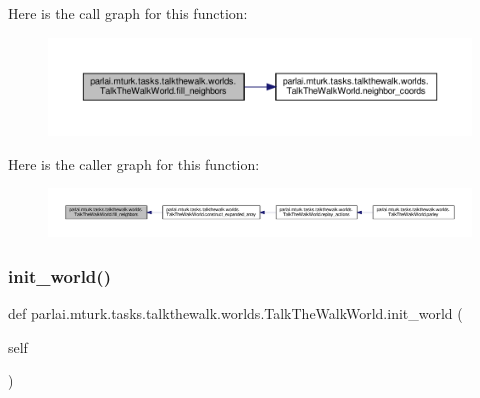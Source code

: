 Here is the call graph for this function\+:
\nopagebreak
\begin{figure}[H]
\begin{center}
\leavevmode
\includegraphics[width=350pt]{classparlai_1_1mturk_1_1tasks_1_1talkthewalk_1_1worlds_1_1TalkTheWalkWorld_a44d5136e6f6808929e818041011d8e71_cgraph}
\end{center}
\end{figure}
Here is the caller graph for this function\+:
\nopagebreak
\begin{figure}[H]
\begin{center}
\leavevmode
\includegraphics[width=350pt]{classparlai_1_1mturk_1_1tasks_1_1talkthewalk_1_1worlds_1_1TalkTheWalkWorld_a44d5136e6f6808929e818041011d8e71_icgraph}
\end{center}
\end{figure}
\mbox{\label{classparlai_1_1mturk_1_1tasks_1_1talkthewalk_1_1worlds_1_1TalkTheWalkWorld_a7a4766cb7ac6f67586387a87c5c3023b}} 
\subsubsection{\texorpdfstring{init\+\_\+world()}{init\_world()}}
{\footnotesize\ttfamily def parlai.\+mturk.\+tasks.\+talkthewalk.\+worlds.\+Talk\+The\+Walk\+World.\+init\+\_\+world (\begin{DoxyParamCaption}\item[{}]{self }\end{DoxyParamCaption})}


